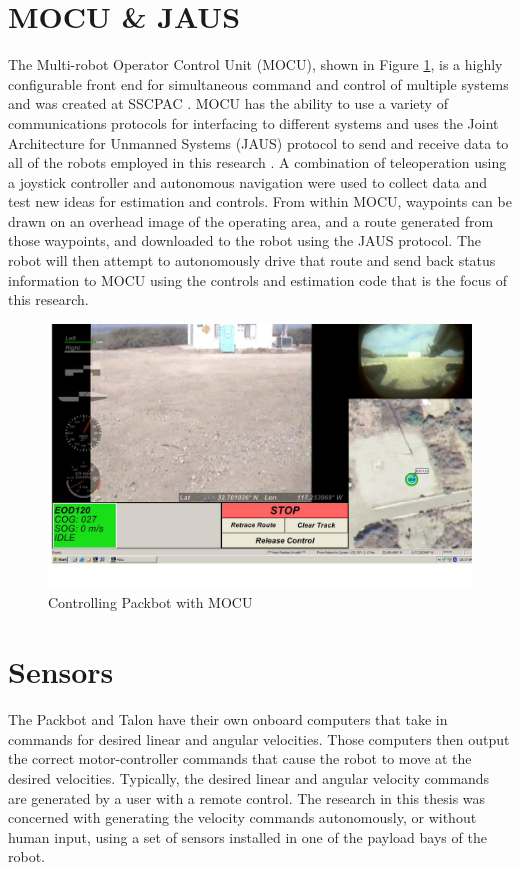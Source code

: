 \section{MOCU \& JAUS}
\label{sec:mocujaus}
The Multi-robot Operator Control Unit (MOCU), shown in Figure \ref{fig:mocu}, is a highly configurable front end for simultaneous command and control of multiple systems and was created at SSCPAC \cite{PowellMOCU08}. MOCU has the ability to use a variety of communications protocols for interfacing to different systems and uses the Joint Architecture for Unmanned Systems (JAUS) protocol to send and receive data to all of the robots employed in this research \cite{RoweJAUS08}. A combination of teleoperation using a joystick controller and autonomous navigation were used to collect data and test new ideas for estimation and controls. From within MOCU, waypoints can be drawn on an overhead image of the operating area, and a route generated from those waypoints, and downloaded to the robot using the JAUS protocol. The robot will then attempt to autonomously drive that route and send back status information to MOCU using the controls and estimation code that is the focus of this research.

\begin{figure}[ht!]
	\centering
	\includegraphics[width=.75\textwidth]{images/mocuPackbotScreenshot}
	\caption{Controlling Packbot with MOCU}
	\label{fig:mocu}
\end{figure}

\section{Sensors}
\label{sec:bgSensors}
The Packbot and Talon have their own onboard computers that take in commands for desired linear and angular velocities. Those computers then output the correct motor-controller commands that cause the robot to move at the desired velocities. Typically, the desired linear and angular velocity commands are generated by a user with a remote control. The research in this thesis was concerned with generating the velocity commands autonomously, or without human input, using a set of sensors installed in one of the payload bays of the robot.

